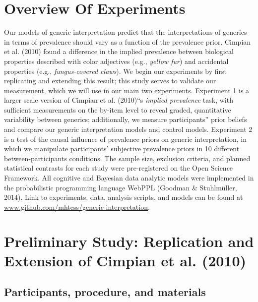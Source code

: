 \documentclass[floatsintext,doc]{apa6}
\begin{document}
\hypertarget{overview-of-experiments}{%
\section{Overview Of Experiments}\label{overview-of-experiments}}

Our models of generic interpretation predict that the interpretations of generics in terms of prevalence should vary as a function of the prevalence prior.
Cimpian et al. (2010) found a difference in the implied prevalence between biological properties described with color adjectives (e.g., \emph{yellow fur}) and accidental properties (e.g., \emph{fungus-covered claws}).
We begin our experiments by first replicating and extending this result; this study serves to validate our measurement, which we will use in our main two experiments.
Experiment 1 is a larger scale version of Cimpian et al. (2010)\enquote{s \emph{implied prevalence} task, with sufficient measurements on the by-item level to reveal graded, quantitative variability between generics; additionally, we measure participants} prior beliefs and compare our generic interpretation models and control models.
Experiment 2 is a test of the causal influence of prevalence priors on generic interpretation, in which we manipulate participants' subjective prevalence priors in 10 different between-participants conditions.
The sample size, exclusion criteria, and planned statistical contrasts for each study were pre-registered on the Open Science Framework.
All cognitive and Bayesian data analytic models were implemented in the probabilistic programming language WebPPL (Goodman \& Stuhlmüller, 2014).
Link to experiments, data, analysis scripts, and models can be found at \url{www.github.com/mhtess/generic-interpretation}.

\hypertarget{preliminary-study-replication-and-extension-of-cimpian-et-al.-2010}{%
\section{Preliminary Study: Replication and Extension of Cimpian et al. (2010)}\label{preliminary-study-replication-and-extension-of-cimpian-et-al.-2010}}


\hypertarget{participants}{%
\subsection{Participants, procedure, and materials}\label{participants}}
\end{document}
